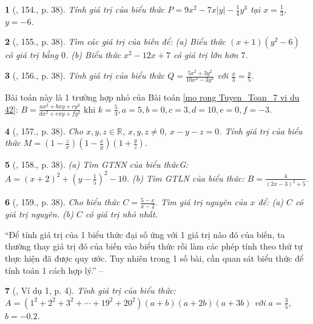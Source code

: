 \documentclass{article}
\newtheorem{baitoan}{}
\begin{document}
\begin{baitoan}[\cite{Tuyen_Toan_7}, 154., p. 38]
	Tính giá trị của biểu thức $P = 9x^2 - 7x|y| - \frac{1}{4}y^3$ tại $x = \frac{1}{3}$, $y = -6$.
\end{baitoan}

\begin{baitoan}[\cite{Tuyen_Toan_7}, 155., p. 38]
	Tìm các giá trị của biến để: (a) Biểu thức $(x + 1)(y^2 - 6)$ có giá trị bằng $0$. (b) Biểu thức $x^2 - 12x + 7$ có giá trị lớn hơn $7$.
\end{baitoan}

\begin{baitoan}[\cite{Tuyen_Toan_7}, 156., p. 38]
	Tính giá trị của biểu thức $Q = \frac{5x^2 + 3y^2}{10x^2 - 3y^2}$ với $\frac{x}{3} = \frac{y}{5}$.
\end{baitoan}
Bài toán này là 1 trường hợp nhỏ của Bài toán \ref{mo rong Tuyen_Toan_7 vi du 42}: $B = \frac{ax^2 + bxy + cy^2}{dx^2 + exy + fy^2}$ khi $k = \frac{5}{3}, a = 5, b = 0, c = 3, d = 10, e = 0, f = -3$.

\begin{baitoan}[\cite{Tuyen_Toan_7}, 157., p. 38]
	Cho $x,y,z\in\mathbb{R}$, $x,y,z\ne0$, $x - y - z = 0$. Tính giá trị của biểu thức $M = \left(1 - \frac{z}{x}\right)\left(1 - \frac{x}{y}\right)\left(1 + \frac{y}{z}\right)$.
\end{baitoan}

\begin{baitoan}[\cite{Tuyen_Toan_7}, 158., p. 38]
	(a) Tìm GTNN của biểu thứcG: $A = (x + 2)^2 + \left(y - \frac{1}{5}\right)^2 - 10$. (b) Tìm GTLN của biểu thức: $B = \frac{4}{(2x - 3)^2 + 5}$.
\end{baitoan}

\begin{baitoan}[\cite{Tuyen_Toan_7}, 159., p. 38]
	Cho biểu thức $C = \frac{5 - x}{x - 2}$. Tìm giá trị nguyên của $x$ để: (a) $C$ có giá trị nguyên. (b) $C$ có giá trị nhỏ nhất.
\end{baitoan}
``Để tính giá trị của 1 biểu thức đại số ứng với 1 giá trị nào đó của biến, ta thường thay giá trị đó của biến vào biểu thức rồi làm các phép tính theo thứ tự thực hiện đã được quy ước. Tuy nhiên trong 1 số bài, cần quan sát biểu thức để tính toán 1 cách hợp lý.'' -- \cite[p. 4]{Binh_Toan_7_tap_2}

\begin{baitoan}[\cite{Binh_Toan_7_tap_2}, Ví dụ 1, p. 4]
	Tính giá trị của biểu thức: $A = (1^2 + 2^2 + 3^2 + \cdots + 19^2 + 20^2)(a + b)(a + 2b)(a + 3b)$ với $a = \frac{3}{5}$, $b = -0.2$.
\end{baitoan}
\end{document}
